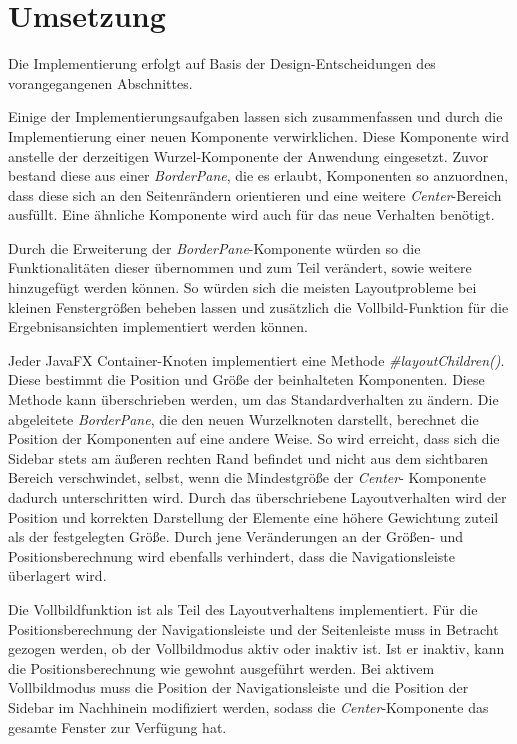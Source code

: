 \section{Umsetzung} \label{sec:responsiveImplementation}
Die Implementierung erfolgt auf Basis der Design-Entscheidungen des vorangegangenen Abschnittes.\par
{}
Einige der Implementierungsaufgaben lassen sich zusammenfassen und durch die Implementierung einer neuen Komponente verwirklichen. Diese Komponente wird anstelle der derzeitigen Wurzel-Komponente der Anwendung eingesetzt. Zuvor bestand diese aus einer \textit{BorderPane}, die es erlaubt, Komponenten so anzuordnen, dass diese sich an den Seitenrändern orientieren und eine weitere \textit{Center}-Bereich ausfüllt. Eine ähnliche Komponente wird auch für das neue Verhalten benötigt.\par
Durch die Erweiterung der \textit{BorderPane}-Komponente würden so die Funktionalitäten dieser übernommen und zum Teil verändert, sowie weitere hinzugefügt werden können. So würden sich die meisten Layoutprobleme bei kleinen Fenstergrößen beheben lassen und zusätzlich die Vollbild-Funktion für die Ergebnisansichten implementiert werden können.\par
Jeder JavaFX Container-Knoten implementiert eine Methode \textit{\#{}layoutChildren()}. Diese bestimmt die Position und Größe der beinhalteten Komponenten. Diese Methode kann überschrieben werden, um das Standardverhalten zu ändern. Die abgeleitete \textit{BorderPane}, die den neuen Wurzelknoten darstellt, berechnet die Position der Komponenten auf eine andere Weise. So wird erreicht, dass sich die Sidebar stets am äußeren rechten Rand befindet und nicht aus dem sichtbaren Bereich verschwindet, selbst, wenn die Mindestgröße der \textit{Center}- Komponente dadurch unterschritten wird. Durch das überschriebene Layoutverhalten wird der Position und korrekten Darstellung der Elemente eine höhere Gewichtung zuteil als der festgelegten Größe. Durch jene Veränderungen an der Größen- und Positionsberechnung wird ebenfalls verhindert, dass die Navigationsleiste überlagert wird.\par
Die Vollbildfunktion ist als Teil des Layoutverhaltens implementiert. Für die Positionsberechnung der Navigationsleiste und der Seitenleiste muss in Betracht gezogen werden, ob der Vollbildmodus aktiv oder inaktiv ist. Ist er inaktiv, kann die Positionsberechnung wie gewohnt ausgeführt werden. Bei aktivem Vollbildmodus muss die Position der Navigationsleiste und die Position der Sidebar im Nachhinein modifiziert werden, sodass die \textit{Center}-Komponente das gesamte Fenster zur Verfügung hat.\par

